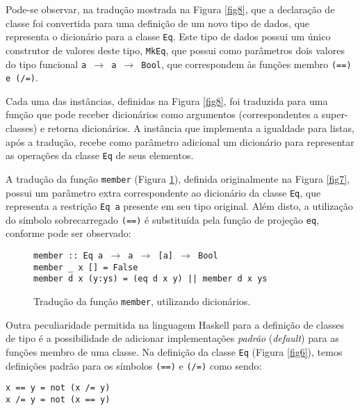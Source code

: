 Pode-se observar, na tradu\c{c}\~ao mostrada na Figura \ref{fig8}, que a declara\c{c}\~ao de classe foi 
convertida para uma defini\c{c}\~ao de um novo tipo de dados, que representa o dicion\'ario para a 
classe \texttt{Eq}. Este tipo de dados possui um \'unico construtor de valores deste tipo, \texttt{MkEq}, 
que possui como par\^ametros dois valores do tipo funcional \texttt{a $\rightarrow$ a $\rightarrow$ Bool}, 
que correspondem \`as fun\c{c}\~oes membro \texttt{(==) e (/=)}. 

Cada uma das inst\^ancias, definidas na Figura \ref{fig8}, foi traduzida para uma fun\c{c}\~ao que 
pode receber dicion\'arios como argumentos (correspondentes a super-classes) e retorna dicion\'arios. 
A inst\^ancia que implementa a igualdade para listas, ap\'os a tradu\c{c}\~ao, recebe como par\^ametro adicional 
um dicion\'ario para representar as opera\c{c}\~oes da classe \texttt{Eq} de seus elementos.

A tradu\c{c}\~ao da fun\c{c}\~ao \texttt{member} (Figura \ref{fig9}), definida originalmente na Figura \ref{fig7}, possui um par\^ametro extra correspondente ao dicion\'ario da classe \texttt{Eq}, que representa a restri\c{c}\~ao \texttt{Eq a} presente em seu tipo original. Al\'em disto, a utiliza\c{c}\~ao do s\'imbolo sobrecarregado \texttt{(==)} \'e substitu\'ida pela fun\c{c}\~ao de proje\c{c}\~ao \texttt{eq}, conforme pode ser observado:
\begin{figure}[h]
   \begin{flushleft}
       \texttt{member :: Eq a $\rightarrow$ a $\rightarrow$ [a] $\rightarrow$ Bool}\\
       \texttt{member \_ x [] = False}\\
       \texttt{member d x (y:ys) = (eq d x y) || member d x ys}
   \end{flushleft}
   \caption{Tradu\c{c}\~ao da fun\c{c}\~ao \texttt{member}, utilizando dicion\'arios.}
   \label{fig9}
\end{figure}

Outra peculiaridade permitida na linguagem Haskell para a defini\c{c}\~ao de classes de tipo 
\'e a possibilidade de adicionar implementa\c{c}\~oes \emph{padr\~ao} (\emph{default}) para as 
fun\c{c}\~oes membro de uma classe. Na defini\c{c}\~ao da classe \texttt{Eq} (Figura \ref{fig6}), 
temos defini\c{c}\~oes padr\~ao para os s\'imbolos \texttt{(==)} e \texttt{(/=)} como sendo:

\begin{verbatim}
x == y = not (x /= y)
x /= y = not (x == y)
\end{verbatim}

